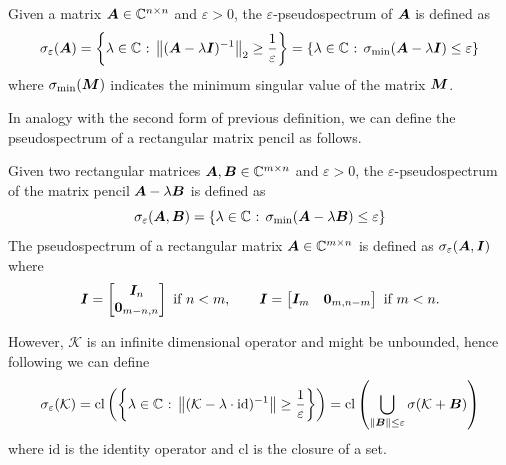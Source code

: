 \begin{definition}
Given a matrix $\vb*{A}\in\mathbb{C}^{n\times n}$ and $\varepsilon > 0$, the $\varepsilon$-pseudospectrum of $\vb*{A}$ is defined as
\begin{equation}
    \label{pseudospectrum_matrix_def}
    \sigma_{\varepsilon}(\vb*{A}) = \left\{ \lambda\in\C \text{ : } \norm{(\vb*{A} - \lambda \vb*{I})^{-1}}_2 \geq \frac{1}{\varepsilon}\right\} = \left\{ \lambda\in\C \text{ : } \sigma_{\mathrm{min}}(\vb*{A} - \lambda \vb*{I}) \leq \varepsilon \right\} %
\end{equation}
where $\sigma_{\mathrm{min}}(\vb*{M})$ indicates the minimum singular value of the matrix $\vb*{M}$.
\end{definition}
In analogy with the second form of previous definition, we can define the pseudospectrum of a rectangular matrix pencil as follows.
\begin{definition}
Given two rectangular matrices $\vb*{A},\vb*{B} \in\mathbb{C}^{m\times n}$ and $\varepsilon > 0$, the $\varepsilon$-pseudospectrum of the matrix pencil $\vb*{A}- \lambda \vb*{B}$ is defined as
\begin{equation}
    \label{pseudospectrum_matrix_pencil_def}
    \sigma_{\varepsilon}(\vb*{A}, \vb*{B}) = \left\{ \lambda\in\C \text{ : } \sigma_{\mathrm{min}}(\vb*{A} - \lambda \vb*{B}) \leq \varepsilon \right\} %
\end{equation}
The pseudospectrum of a rectangular matrix $\vb*{A}\in\mathbb{C}^{m\times n}$ is defined as $    \sigma_{\varepsilon}(\vb*{A}, \vb*{I})$ where
\begin{equation}
    \vb*{I} = \begin{bmatrix} \vb*{I}_n \\ \vb*{0}_{m-n,n}\end{bmatrix} \text{ if $n<m$}, \qquad \vb*{I} = \begin{bmatrix} \vb*{I}_m & \vb*{0}_{m,n-m}\end{bmatrix} \text{ if $m<n$}.
\end{equation}
\end{definition}
However, $\mathcal{K}$ is an infinite dimensional operator and might be unbounded, hence following \cite{colbrook_rigorous_2021} we can define
\begin{equation}
    \label{pseudospectrum_koopman_def}
    \sigma_{\varepsilon}(\mathcal{K}) = \mathrm{cl}\left( \left\{ \lambda\in\mathbb{C} \text{ : } \norm{(\mathcal{K} - \lambda \cdot \mathrm{id})^{-1}} \geq \frac{1}{\varepsilon}\right\} \right) = \mathrm{cl}\left( \bigcup_{\norm{\vb*{B}} \leq \varepsilon} \sigma(\mathcal{K}+ \vb*{B}) \right)
\end{equation}
where $\mathrm{id}$ is the identity operator and $\mathrm{cl}$ is the closure of a set.



